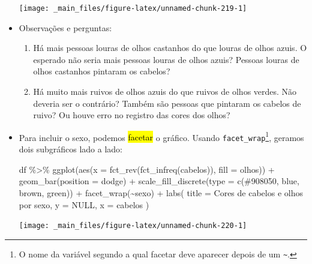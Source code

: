 \documentclass[
  11pt]{report}
\newenvironment{Shaded}{\begin{snugshade}}{\end{snugshade}}
\newcommand{\AttributeTok}[1]{\textcolor[rgb]{0.77,0.63,0.00}{#1}}
\newcommand{\ConstantTok}[1]{\textcolor[rgb]{0.00,0.00,0.00}{#1}}
\newcommand{\FunctionTok}[1]{\textcolor[rgb]{0.00,0.00,0.00}{#1}}
\newcommand{\NormalTok}[1]{#1}
\newcommand{\SpecialCharTok}[1]{\textcolor[rgb]{0.00,0.00,0.00}{#1}}
\newcommand{\StringTok}[1]{\textcolor[rgb]{0.31,0.60,0.02}{#1}}
\renewenvironment{Shaded}{
    \begin{mdframed}[%
      roundcorner=2pt,%
      innerleftmargin=5pt,%
      innerrightmargin=5pt,%
      topline=true,%
      leftline=true,%
      rightline=true,%
      bottomline=true,%
      linewidth=0.5pt,%
      linecolor=black!20,%
      backgroundcolor=black!2,%
      skipabove=2ex,%
      skipbelow=2.5ex%
    ]%
  }
  {
    \end{mdframed}
  }
\begin{document}
\begin{itemize}
  \begin{center}\texttt{[image: \_main\_files/figure-latex/unnamed-chunk-219-1]} \end{center}
\item
  Observações e perguntas:

  \begin{enumerate}
  \def\labelenumi{\arabic{enumi}.}
  \item
    Há mais pessoas louras de olhos castanhos do que louras de olhos azuis. O esperado não seria mais pessoas louras de olhos azuis? Pessoas louras de olhos castanhos pintaram os cabelos?
  \item
    Há muito mais ruivos de olhos azuis do que ruivos de olhos verdes. Não deveria ser o contrário? Também são pessoas que pintaram os cabelos de ruivo? Ou houve erro no registro das cores dos olhos?
  \end{enumerate}
\item
  Para incluir o sexo, podemos {\hl{facetar}} o gráfico. Usando \texttt{facet\_wrap}\footnote{O nome da variável segundo a qual facetar deve aparecer depois de um \texttt{\textasciitilde{}}.}, geramos dois subgráficos lado a lado:

\begin{Shaded}
\begin{Highlighting}[]
\NormalTok{df }\SpecialCharTok{\%\textgreater{}\%} 
  \FunctionTok{ggplot}\NormalTok{(}\FunctionTok{aes}\NormalTok{(}\AttributeTok{x =} \FunctionTok{fct\_rev}\NormalTok{(}\FunctionTok{fct\_infreq}\NormalTok{(cabelos)), }\AttributeTok{fill =}\NormalTok{ olhos)) }\SpecialCharTok{+}
    \FunctionTok{geom\_bar}\NormalTok{(}\AttributeTok{position =} \StringTok{\textquotesingle{}dodge\textquotesingle{}}\NormalTok{) }\SpecialCharTok{+}
    \FunctionTok{scale\_fill\_discrete}\NormalTok{(}\AttributeTok{type =} \FunctionTok{c}\NormalTok{(}\StringTok{\textquotesingle{}\#908050\textquotesingle{}}\NormalTok{, }\StringTok{\textquotesingle{}blue\textquotesingle{}}\NormalTok{, }\StringTok{\textquotesingle{}brown\textquotesingle{}}\NormalTok{, }\StringTok{\textquotesingle{}green\textquotesingle{}}\NormalTok{)) }\SpecialCharTok{+}
    \FunctionTok{facet\_wrap}\NormalTok{(}\SpecialCharTok{\textasciitilde{}}\NormalTok{sexo) }\SpecialCharTok{+}
    \FunctionTok{labs}\NormalTok{(}
      \AttributeTok{title =} \StringTok{\textquotesingle{}Cores de cabelos e olhos por sexo\textquotesingle{}}\NormalTok{,}
      \AttributeTok{y =} \ConstantTok{NULL}\NormalTok{,}
      \AttributeTok{x =} \StringTok{\textquotesingle{}cabelos\textquotesingle{}}
\NormalTok{    )}
\end{Highlighting}
\end{Shaded}

  \begin{center}\texttt{[image: \_main\_files/figure-latex/unnamed-chunk-220-1]} \end{center}
\end{itemize}
\end{document}
